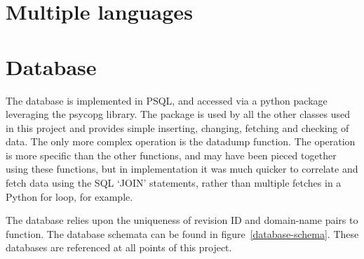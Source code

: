 \section{Multiple languages}

\section{Database}
The database is implemented in PSQL, and accessed via a python package
leveraging the psycopg library. The package is used by all the other
classes used in this project and provides simple inserting, changing,
fetching and checking of data. The only more complex operation is the
datadump function. The operation is more specific than the other
functions, and may have been pieced together using these functions,
but in implementation it was much quicker to correlate and fetch data
using the SQL `JOIN' statements, rather than multiple fetches in a
Python for loop, for example.

The database relies upon the uniqueness of revision ID and domain-name
pairs to function. The database schemata can be found in
figure~\ref{database-schema}. These databases are referenced at all
points of this project.

